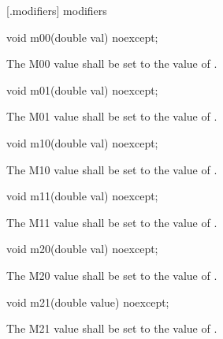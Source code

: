  [\matrixtwod.modifiers] { modifiers}

\begin{itemdecl}
void m00(double val) noexcept;
\end{itemdecl}
\begin{itemdescr}
\pnum
\effects
The M00 value shall be set to the value of .
\end{itemdescr}

\begin{itemdecl}
void m01(double val) noexcept;
\end{itemdecl}
\begin{itemdescr}
\pnum
\effects
The M01 value shall be set to the value of .
\end{itemdescr}

\begin{itemdecl}
void m10(double val) noexcept;
\end{itemdecl}
\begin{itemdescr}
\pnum
\effects
The M10 value shall be set to the value of .
\end{itemdescr}

\begin{itemdecl}
void m11(double val) noexcept;
\end{itemdecl}
\begin{itemdescr}
\pnum
\effects
The M11 value shall be set to the value of .
\end{itemdescr}

\begin{itemdecl}
void m20(double val) noexcept;
\end{itemdecl}
\begin{itemdescr}
\pnum
\effects
The M20 value shall be set to the value of .
\end{itemdescr}

\begin{itemdecl}
void m21(double value) noexcept;
\end{itemdecl}
\begin{itemdescr}
\pnum
\effects
The M21 value shall be set to the value of .
\end{itemdescr}

